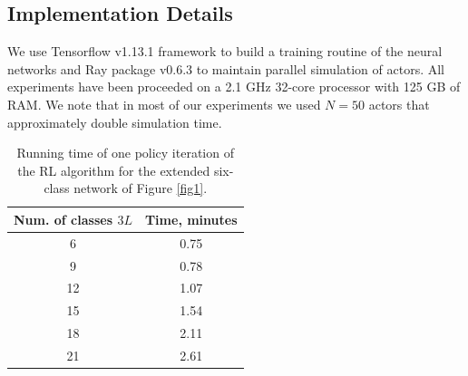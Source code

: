 \documentclass[11pt]{article}
\theoremstyle{definition}
\numberwithin{equation}{section}
\begin{document}
   
   \subsection{Implementation Details}
   
   We use Tensorflow v1.13.1 framework \cite{Abadi2016} to build a training routine of the neural networks and Ray package v0.6.3 \cite{Moritz2018} to maintain parallel simulation of actors. All experiments have been proceeded on a   2.1 GHz  32-core processor with 125 GB of RAM. We note that in most of our experiments we used $N=50$ actors that approximately double simulation time.
   
   
   \begin{table}[H]
\centering%
\begin{tabular}{|c|c|}
  \hline
  Num. of classes $3L$  & Time, minutes  \\\hline
  6 & 0.75 \\\hline
  9 & 0.78 \\\hline
  12  & 1.07\\\hline
  15  & 1.54 \\\hline
  18  & 2.11\\\hline
  21  & 2.61 \\
  \hline
\end{tabular}
\caption[]{Running time of one policy iteration of the RL algorithm for the extended six-class network of Figure \ref{fig1}.}\label{tab:rt}
\end{table}





\end{document}

